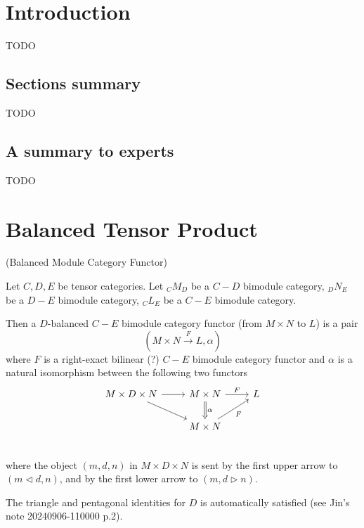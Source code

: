 \section{Introduction}

TODO

\subsection{Sections summary}

TODO

\subsection{A summary to experts}\label{subsection/a-summary-to-experts}

TODO

\section{Balanced Tensor Product}\label{section/balanced-tensor-product}

\begin{definition} (Balanced Module Category Functor)

  \noindent Let $C, D, E$ be tensor categories. Let $_{C}M_{D}$ be a $C-D$
  bimodule category, $_{D}N_{E}$ be a $D-E$ bimodule category, $_{C}L_{E}$ be a $C-E$ bimodule category.

  \noindent Then a $D$-balanced $C-E$ bimodule category functor (from $M \times N$ to $L$) is a pair
  \[(M \times N \xrightarrow{F} L, \alpha)\]
  where $F$ is a right-exact bilinear (?) $C-E$ bimodule category functor and $\alpha$ is a natural isomorphism between the following two functors
  \[
    \begin{tikzcd}
      M \times D \times N \arrow[r] \arrow[dr] &
      M \times N \arrow[d, Rightarrow, "\alpha"] \arrow[r, "F"] &
      L \\
      & M \times N \arrow[ur, "F"'] \\
    \end{tikzcd}
  \]
  where the object $(m,d,n)$ in $M \times D \times N$ is sent by the first
  upper arrow to $(m \lhd d, n)$, and by the first lower arrow to $(m, d \rhd n)$.
\end{definition}

\begin{remark}
  The triangle and pentagonal identities for $D$ is automatically satisfied
  (see Jin's note 20240906-110000 p.2).
\end{remark}

